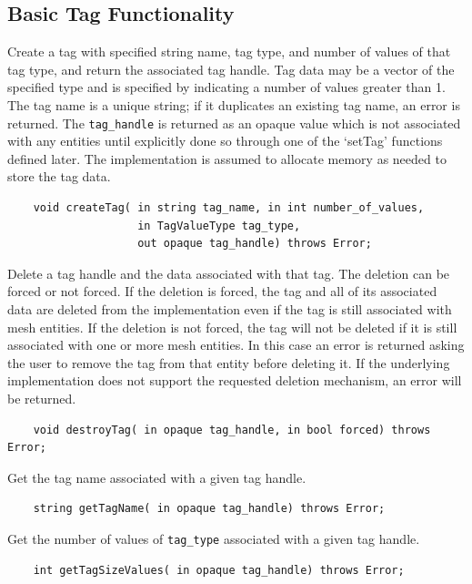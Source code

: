 \documentclass{article}
\begin{document}
\subsection{Basic Tag Functionality}
Create a tag with specified string name, tag 
type, and number of values of that tag type, and return the associated 
tag handle. Tag data may be a vector of the specified type and 
is specified by indicating a number of values greater than 1. 
The tag name is a unique string; if it duplicates an existing 
tag name, an error is returned. The {\tt tag\_handle} is returned as 
an opaque value which is not associated with any entities until 
explicitly done so through one of the `setTag' functions defined 
later. The implementation is assumed to allocate memory as needed 
to store the tag data.

\begin{verbatim}
    void createTag( in string tag_name, in int number_of_values, 
                    in TagValueType tag_type,
                    out opaque tag_handle) throws Error;
\end{verbatim}

Delete a tag handle and the data associated with that tag. The 
deletion can be forced or not forced. If the deletion is forced, 
the tag and all of its associated data are deleted from the implementation 
even if the tag is still associated with mesh entities. If the 
deletion is not forced, the tag will not be deleted if it is 
still associated with one or more mesh entities. In this case 
an error is returned asking the user to remove the tag from that 
entity before deleting it.  If the underlying implementation 
does not support the requested deletion mechanism, an error will 
be returned.

\begin{verbatim}
    void destroyTag( in opaque tag_handle, in bool forced) throws Error;
\end{verbatim}

Get the tag name associated with a given tag handle.
\begin{verbatim}
    string getTagName( in opaque tag_handle) throws Error;
\end{verbatim}

Get the number of values of {\tt tag\_type} associated with a given 
tag handle.
\begin{verbatim}    
    int getTagSizeValues( in opaque tag_handle) throws Error;
\end{verbatim}
\end{document}

